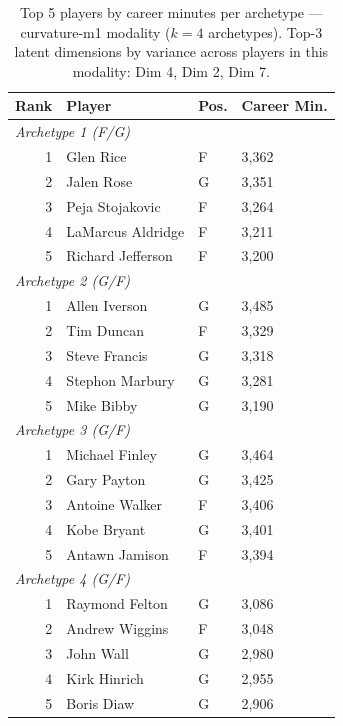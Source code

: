 \begin{table}[htbp]
  \centering\small
  \begin{tabular}{rlll}
    \toprule
    Rank & Player & Pos. & Career Min. \\
    \midrule
    \multicolumn{4}{l}{\textit{Archetype 1 (F/G)}} \\
    \midrule
    1 & Glen Rice & F & 3,362 \\
    2 & Jalen Rose & G & 3,351 \\
    3 & Peja Stojakovic & F & 3,264 \\
    4 & LaMarcus Aldridge & F & 3,211 \\
    5 & Richard Jefferson & F & 3,200 \\
    \midrule[0.4pt]
    \multicolumn{4}{l}{\textit{Archetype 2 (G/F)}} \\
    \midrule
    1 & Allen Iverson & G & 3,485 \\
    2 & Tim Duncan & F & 3,329 \\
    3 & Steve Francis & G & 3,318 \\
    4 & Stephon Marbury & G & 3,281 \\
    5 & Mike Bibby & G & 3,190 \\
    \midrule[0.4pt]
    \multicolumn{4}{l}{\textit{Archetype 3 (G/F)}} \\
    \midrule
    1 & Michael Finley & G & 3,464 \\
    2 & Gary Payton & G & 3,425 \\
    3 & Antoine Walker & F & 3,406 \\
    4 & Kobe Bryant & G & 3,401 \\
    5 & Antawn Jamison & F & 3,394 \\
    \midrule[0.4pt]
    \multicolumn{4}{l}{\textit{Archetype 4 (G/F)}} \\
    \midrule
    1 & Raymond Felton & G & 3,086 \\
    2 & Andrew Wiggins & F & 3,048 \\
    3 & John Wall & G & 2,980 \\
    4 & Kirk Hinrich & G & 2,955 \\
    5 & Boris Diaw & G & 2,906 \\
    \bottomrule
  \end{tabular}
  \caption{Top 5 players by career minutes per archetype --- curvature-m1 modality ($k=4$ archetypes). Top-3 latent dimensions by variance across players in this modality: Dim 4, Dim 2, Dim 7.}
  \label{tab:arch_reps_curvature_m1}
\end{table}

